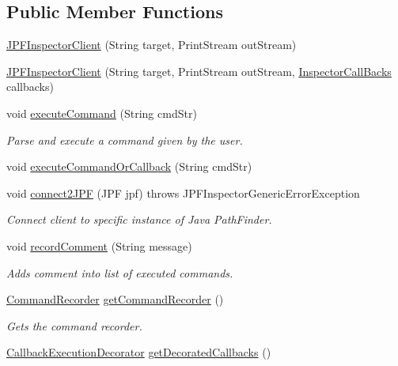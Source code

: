 \subsection*{Public Member Functions}
\begin{DoxyCompactItemize}
\item 
\hyperlink{classgov_1_1nasa_1_1jpf_1_1inspector_1_1client_1_1_j_p_f_inspector_client_a98b7e4d20d0ee2708f967ae4505de9d3}{J\+P\+F\+Inspector\+Client} (String target, Print\+Stream out\+Stream)
\item 
\hyperlink{classgov_1_1nasa_1_1jpf_1_1inspector_1_1client_1_1_j_p_f_inspector_client_a234a292699707e88587fc54b0cfb2b84}{J\+P\+F\+Inspector\+Client} (String target, Print\+Stream out\+Stream, \hyperlink{interfacegov_1_1nasa_1_1jpf_1_1inspector_1_1interfaces_1_1_inspector_call_backs}{Inspector\+Call\+Backs} callbacks)
\item 
void \hyperlink{classgov_1_1nasa_1_1jpf_1_1inspector_1_1client_1_1_j_p_f_inspector_client_a31eb8d1e4bc45b2394fe204fc0b9e535}{execute\+Command} (String cmd\+Str)
\begin{DoxyCompactList}\small\item\em Parse and execute a command given by the user. \end{DoxyCompactList}\item 
void \hyperlink{classgov_1_1nasa_1_1jpf_1_1inspector_1_1client_1_1_j_p_f_inspector_client_ae2f2e017c40296d1a8b3bfdcc95ad93e}{execute\+Command\+Or\+Callback} (String cmd\+Str)
\item 
void \hyperlink{classgov_1_1nasa_1_1jpf_1_1inspector_1_1client_1_1_j_p_f_inspector_client_ab51c37f47e241493d1a5b6b4c32d09df}{connect2\+J\+PF} (J\+PF jpf)  throws J\+P\+F\+Inspector\+Generic\+Error\+Exception 
\begin{DoxyCompactList}\small\item\em Connect client to specific instance of Java Path\+Finder. \end{DoxyCompactList}\item 
void \hyperlink{classgov_1_1nasa_1_1jpf_1_1inspector_1_1client_1_1_j_p_f_inspector_client_af171559f38358893908a09ef76ff800f}{record\+Comment} (String message)
\begin{DoxyCompactList}\small\item\em Adds comment into list of executed commands. \end{DoxyCompactList}\item 
\hyperlink{classgov_1_1nasa_1_1jpf_1_1inspector_1_1client_1_1_command_recorder}{Command\+Recorder} \hyperlink{classgov_1_1nasa_1_1jpf_1_1inspector_1_1client_1_1_j_p_f_inspector_client_a26aa52408f9d36108d756e347ca94128}{get\+Command\+Recorder} ()
\begin{DoxyCompactList}\small\item\em Gets the command recorder. \end{DoxyCompactList}\item 
\hyperlink{classgov_1_1nasa_1_1jpf_1_1inspector_1_1client_1_1_callback_execution_decorator}{Callback\+Execution\+Decorator} \hyperlink{classgov_1_1nasa_1_1jpf_1_1inspector_1_1client_1_1_j_p_f_inspector_client_ace146da17afc70b1ced2dbf72fb900e7}{get\+Decorated\+Callbacks} ()
\end{DoxyCompactItemize}
